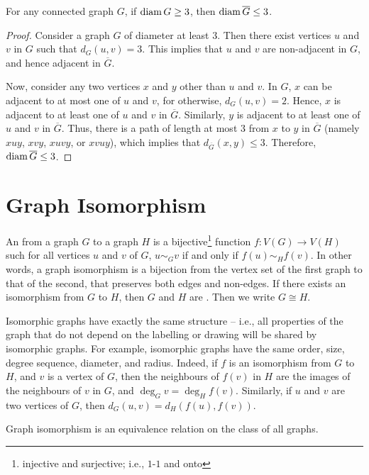 \begin{Theorem}\label{thm:Diam>=3}
For any connected graph $G$, if $\operatorname{diam} G \ge 3$, then $\operatorname{diam} \overline G \le 3$.
\end{Theorem}

\begin{proof}
Consider a graph $G$ of diameter at least $3$. Then there exist vertices $u$ and $v$ in $G$ such that $d_G(u, v) = 3$. This implies that $u$ and $v$ are non-adjacent in $G$, and hence adjacent in $\overline G$.

Now, consider any two vertices $x$ and $y$ other than $u$ and $v$. In $G$, $x$ can be adjacent to at most one of $u$ and $v$, for otherwise, $d_G(u,v) = 2$. Hence, $x$ is adjacent to at least one of $u$ and $v$ in $\overline G$. Similarly, $y$ is adjacent to at least one of $u$ and $v$ in $\overline G$. Thus, there is a path of length at most $3$ from $x$ to $y$ in $\overline G$ (namely $xuy$, $xvy$, $xuvy$, or $xvuy$), which implies that $d_{\overline G}(x, y) \le 3$. Therefore, $\operatorname{diam} \overline G \le 3$.
\end{proof}

\section{Graph Isomorphism}\label{sec:Isomorphism}

An  from a graph $G$ to a graph $H$ is a bijective\footnote{injective and surjective; i.e., $1$-$1$ and onto} function $f \colon V(G) \to V(H)$ such for all vertices $u$ and $v$ of $G$, $u \sim_G v$ if and only if $f(u) \sim_H f(v)$. In other words, a graph isomorphism is a bijection from the vertex set of the first graph to that of the second, that preserves both edges and non-edges. If there exists an isomorphism from $G$ to $H$, then $G$ and $H$ are . Then we write $G \cong H$.

Isomorphic graphs have exactly the same structure -- i.e., all properties of the graph that do not depend on the labelling or drawing will be shared by isomorphic graphs. For example, isomorphic graphs have the same order, size, degree sequence, diameter, and radius. Indeed, if $f$ is an isomorphism from $G$ to $H$, and $v$ is a vertex of $G$, then the neighbours of $f(v)$ in $H$ are the images of the neighbours of $v$ in $G$, and $\deg_G v = \deg_H f(v)$. Similarly, if $u$ and $v$ are two vertices of $G$, then $d_G(u, v) = d_H(f(u), f(v))$.

\begin{Theorem}
Graph isomorphism is an equivalence relation on the class of all graphs.
\end{Theorem}


